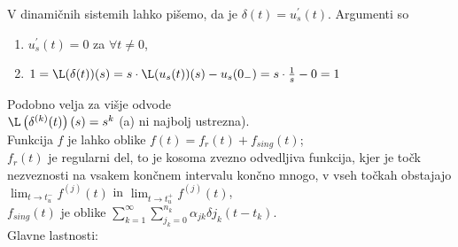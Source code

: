 \documentclass[a4paper, 12pt]{book}
\theoremstyle{definition}
\theoremstyle{remark}
\begin{document}
V dinamičnih sistemih lahko pišemo, da je $\delta(t) = u_s^{'}(t)$.
Argumenti so
\begin{enumerate}[label=\alph*)]
    \item $u_s^{'}(t) = 0$ za $\forall t \neq 0$,
    \item $1 = \L(\delta(t))(s) = s \cdot \L(u_s(t))(s) - u_s(0_-) = s \cdot \frac{1}{s} - 0 = 1$ \checkmark
\end{enumerate}
Podobno velja za višje odvode \\
$\L\left(\delta^{(k)}(t)\right)(s) = s^k$ (a) ni najbolj ustrezna). \\
Funkcija $f$ je lahko oblike $f(t) = f_r(t) + f_{sing}(t)$; \\
$f_r(t)$ je regularni del, to je kosoma zvezno odvedljiva funkcija,
kjer je točk nezveznosti na vsakem končnem intervalu končno mnogo, v vseh točkah obstajajo
$\lim_{t \to t_u^-} f^{(j)}(t)$ in $\lim_{t \to t_u^+} f^{(j)}(t)$, \\
$f_{sing}(t)$ je oblike $\sum_{k=1}^{\infty} \sum_{j_k=0}^{n_k} \alpha_{jk} \delta{j_k} (t-t_k)$. \\
Glavne lastnosti:
\end{document}
